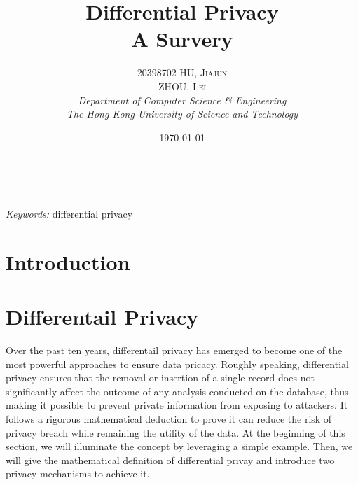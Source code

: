 \documentclass[a4paper, 11pt]{article} %
\title{\textbf{Differential Privacy}\\ %
A Survery} %
\author{\textsc{20398702 HU, Jiajun \\ ZHOU, Lei} %
\\{\textit{Department of Computer Science \& Engineering \\ The Hong Kong University of Science and Technology}}} %
\date{\today} %
\makeatletter
\theoremstyle{definition}
\renewcommand{\maketitle}{ %
\begin{flushright} %
{\LARGE\@title} %

\vspace{50pt} %

{\large\@author} %
\\\@date %

\vspace{40pt} %
\end{flushright}
}
\makeatother
\begin{document}
\maketitle %



\begin{abstract}

\end{abstract}

\hspace*{3,6mm}\textit{Keywords:} differential privacy %

\vspace{30pt} %


\section{Introduction}








\section{Differentail Privacy}

Over the past ten years, differentail privacy\cite{dwork2008differential, dwork2014algorithmic} has emerged to become one of the most powerful approaches to ensure data pricacy. Roughly speaking, differential privacy ensures that the removal or insertion of a single record does not significantly affect the outcome of any analysis conducted on the database, thus making it possible to prevent private information from exposing to attackers. It follows a rigorous mathematical deduction to prove it can reduce the risk of privacy breach while remaining the utility of the data. At the beginning of this section, we will illuminate the concept by leveraging a simple example. Then, we will give the mathematical definition of differential privay and introduce two privacy mechanisms to achieve it.
\end{document}
